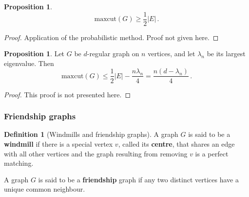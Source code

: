 \documentclass[12pt]{amsart}
\theoremstyle{definition}
\newtheorem{prop}[thm]{Proposition}
\newtheorem{defin}[thm]{Definition}
\newcommand{\maxcut}{\mathrm{maxcut}}
\begin{document}
\begin{prop}
$$\maxcut(G) \geq \frac{1}{2}|E| \, .$$
\end{prop}

\begin{proof}
Application of the probabilistic method.
Proof not given here.
\end{proof}


\begin{prop}
Let $G$ be $d$-regular graph on $n$ vertices, and let $\lambda_n$ be its largest eigenvalue.
Then 
$$\maxcut(G) \leq \frac{1}{2} |E| - \frac{n \lambda_n}{4} = \frac{n (d-\lambda_n)}{4} \, . $$
\end{prop}

\begin{proof}
This proof is not presented here.
\end{proof}



\subsubsection*{Friendship graphs}

\begin{defin}[Windmills and friendship graphs]
A graph $G$ is said to be a \textbf{windmill} if there is a special vertex $v$, called its \textbf{centre}, that shares an edge with all other vertices and the graph resulting from removing $v$ is a perfect matching.

A graph $G$ is said to be a \textbf{friendship} graph if any two distinct vertices have a unique common neighbour.
\end{defin}
\end{document}

